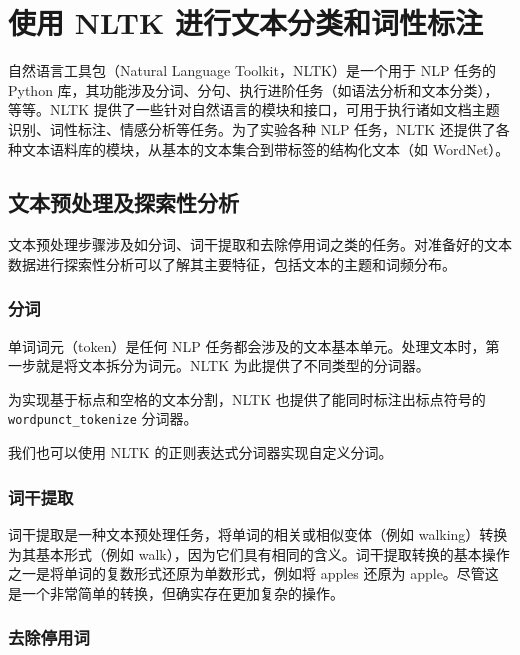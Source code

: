 \chapter{使用 NLTK 进行文本分类和词性标注\label{ch02}}

自然语言工具包（Natural Language Toolkit，NLTK）是一个用于 NLP 任务的 Python 库，其功能涉及分词、分句、执行进阶任务（如语法分析和文本分类），等等。NLTK 提供了一些针对自然语言的模块和接口，可用于执行诸如文档主题识别、词性标注、情感分析等任务。为了实验各种 NLP 任务，NLTK 还提供了各种文本语料库的模块，从基本的文本集合到带标签的结构化文本（如 WordNet）。
\section{文本预处理及探索性分析}
文本预处理步骤涉及如分词、词干提取和去除停用词之类的任务。对准备好的文本数据进行探索性分析可以了解其主要特征，包括文本的主题和词频分布。
\subsection{分词}
单词词元（token）是任何 NLP 任务都会涉及的文本基本单元。处理文本时，第一步就是将文本拆分为词元。NLTK 为此提供了不同类型的分词器。

为实现基于标点和空格的文本分割，NLTK 也提供了能同时标注出标点符号的 \verb|wordpunct_tokenize| 分词器。

我们也可以使用 NLTK 的正则表达式分词器实现自定义分词。
\subsection{词干提取}
词干提取是一种文本预处理任务，将单词的相关或相似变体（例如 walking）转换为其基本形式（例如 walk），因为它们具有相同的含义。词干提取转换的基本操作之一是将单词的复数形式还原为单数形式，例如将 apples 还原为 apple。尽管这是一个非常简单的转换，但确实存在更加复杂的操作。
\subsection{去除停用词}